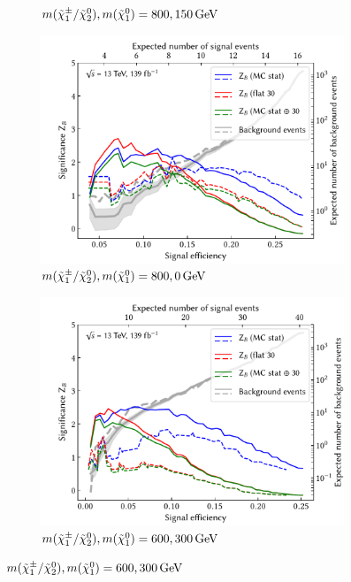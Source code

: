 \begin{figure}[hb]
\begin{subfigure}[b]{0.5\linewidth}
		\caption{$m(\charg/\neutr), m(\lsp) =  800, \SI{150}{\GeV}$}
	\end{subfigure}\hfill
	\par\bigskip
	\begin{subfigure}[b]{0.5\linewidth}
		\centering\includegraphics[width=1.0\textwidth]{N-1_cut_scan/z_vs_effs_800_0.pdf}
		\caption{$m(\charg/\neutr), m(\lsp) =  800, \SI{0}{\GeV}$}
	\end{subfigure}\hfill
	\begin{subfigure}[b]{0.5\linewidth}
		\centering\includegraphics[width=1.0\textwidth]{N-1_cut_scan/z_vs_effs_600_300.pdf}
		\caption{$m(\charg/\neutr), m(\lsp) =  600, \SI{300}{\GeV}$}
	\end{subfigure}\hfill

\end{figure}
